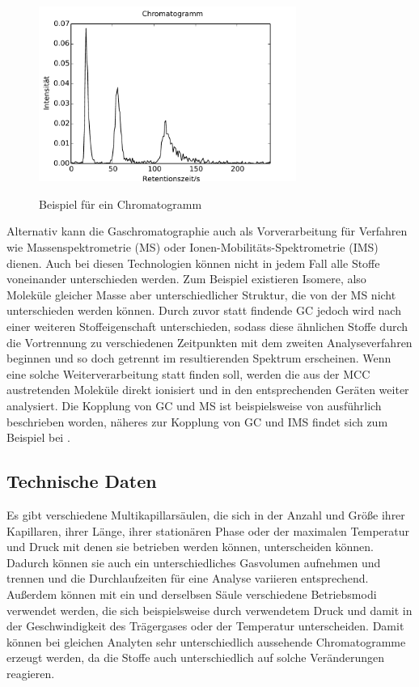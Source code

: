 \begin{figure}
 \centering
  \includegraphics[width = 0.75\textwidth]{bilder/spektrum}\\
  \caption{Beispiel für ein Chromatogramm}
  \label{chromatogramm}
\end{figure}

Alternativ kann die Gaschromatographie auch als Vorverarbeitung für Verfahren wie Massenspektrometrie (MS) oder Ionen-Mobilitäts-Spektrometrie (IMS) dienen. Auch bei diesen Technologien können nicht in jedem Fall alle Stoffe voneinander unterschieden werden. Zum Beispiel existieren Isomere, also Moleküle gleicher Masse aber unterschiedlicher Struktur, die von der MS nicht unterschieden werden können. Durch zuvor statt findende GC jedoch wird nach einer weiteren Stoffeigenschaft unterschieden, sodass diese ähnlichen Stoffe durch die Vortrennung zu verschiedenen Zeitpunkten mit dem zweiten Analyseverfahren beginnen und so doch getrennt im resultierenden Spektrum erscheinen. Wenn eine solche Weiterverarbeitung statt finden soll, werden die aus der MCC austretenden Moleküle direkt ionisiert und in den entsprechenden Geräten weiter analysiert.
Die Kopplung von GC und MS ist beispielsweise von \cite{Hubschmann2009} ausführlich beschrieben worden, näheres zur Kopplung von GC und IMS findet sich zum Beispiel bei \citep{Baumbach2009}. 


\subsection{Technische Daten}

Es gibt verschiedene Multikapillarsäulen, die sich in der Anzahl und Größe ihrer Kapillaren, ihrer Länge, ihrer stationären Phase oder der maximalen Temperatur und Druck mit denen sie betrieben werden können, unterscheiden können. Dadurch können sie auch ein unterschiedliches Gasvolumen aufnehmen und trennen und die Durchlaufzeiten für eine Analyse variieren entsprechend. Außerdem können mit ein und derselbsen Säule verschiedene Betriebsmodi verwendet werden, die sich beispielsweise durch verwendetem Druck und damit in der Geschwindigkeit des Trägergases oder der Temperatur unterscheiden. Damit können bei gleichen Analyten sehr unterschiedlich aussehende Chromatogramme erzeugt werden, da die Stoffe auch unterschiedlich auf solche Veränderungen reagieren.

